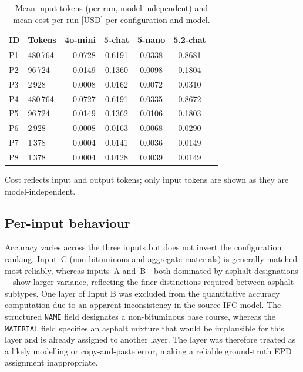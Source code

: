 \documentclass[10pt, a4paper, twocolumn]{article}
\begin{document}
\begin{table}[htbp]
  \caption{Mean input tokens (per run, model-independent) and mean cost per run [USD]
           per configuration and model.}
  \label{tab:cost}
  \centering
  \small
  \begin{tabular}{llrcccc}
    \toprule
    \textbf{ID}  & \textbf{Tokens} & \textbf{4o-mini} & \textbf{5-chat} & \textbf{5-nano} & \textbf{5.2-chat} \\
    \midrule
    P1     & 480\,764 & 0.0728 & 0.6191 & 0.0338 & 0.8681 \\
    P2        &  96\,724 & 0.0149 & 0.1360 & 0.0098 & 0.1804 \\
    P3       &   2\,928 & 0.0008 & 0.0162 & 0.0072 & 0.0310 \\
    P4     & 480\,764 & 0.0727 & 0.6191 & 0.0335 & 0.8672 \\
    P5    &  96\,724 & 0.0149 & 0.1362 & 0.0106 & 0.1803 \\
    P6   &   2\,928 & 0.0008 & 0.0163 & 0.0068 & 0.0290 \\
    P7  &   1\,378 & 0.0004 & 0.0141 & 0.0036 & 0.0149 \\
    P8          &   1\,378 & 0.0004 & 0.0128 & 0.0039 & 0.0149 \\
    \bottomrule
  \end{tabular}
\end{table}

Cost reflects input and output tokens; only input tokens are shown as they are model-independent.

\subsection{Per-input behaviour}

Accuracy varies across the three inputs but does not invert the configuration ranking.
Input~C (non-bituminous and aggregate materials) is generally matched most reliably,
whereas inputs~A and~B---both dominated by asphalt designations---show larger
variance, reflecting the finer distinctions required between asphalt subtypes. 
One layer of Input B was excluded from the quantitative accuracy computation due to an apparent inconsistency in the source IFC model. The structured \texttt{NAME} field designates a non-bituminous base course, whereas the \texttt{MATERIAL} field specifies an asphalt mixture that would be implausible for this layer and is already assigned to another layer. The layer was therefore treated as a likely modelling or copy-and-paste error, making a reliable ground-truth EPD assignment inappropriate.
\end{document}
